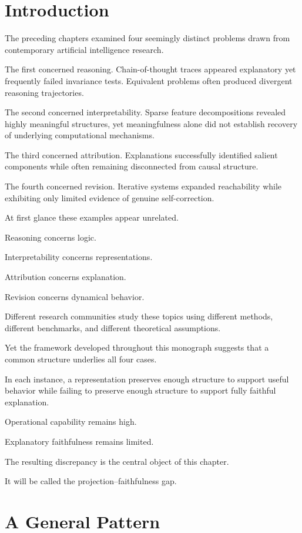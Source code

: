 \documentclass[11pt,oneside,openany]{book}
\begin{document}
\section{Introduction}

The preceding chapters examined four seemingly distinct problems drawn from contemporary artificial intelligence research.

The first concerned reasoning. Chain-of-thought traces appeared explanatory yet frequently failed invariance tests. Equivalent problems often produced divergent reasoning trajectories.

The second concerned interpretability. Sparse feature decompositions revealed highly meaningful structures, yet meaningfulness alone did not establish recovery of underlying computational mechanisms.

The third concerned attribution. Explanations successfully identified salient components while often remaining disconnected from causal structure.

The fourth concerned revision. Iterative systems expanded reachability while exhibiting only limited evidence of genuine self-correction.

At first glance these examples appear unrelated.

Reasoning concerns logic.

Interpretability concerns representations.

Attribution concerns explanation.

Revision concerns dynamical behavior.

Different research communities study these topics using different methods, different benchmarks, and different theoretical assumptions.

Yet the framework developed throughout this monograph suggests that a common structure underlies all four cases.

In each instance, a representation preserves enough structure to support useful behavior while failing to preserve enough structure to support fully faithful explanation.

Operational capability remains high.

Explanatory faithfulness remains limited.

The resulting discrepancy is the central object of this chapter.

It will be called the projection--faithfulness gap.

\section{A General Pattern}
\end{document}

